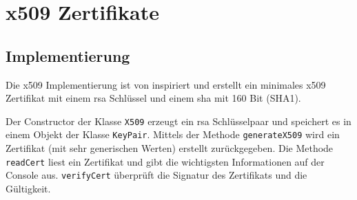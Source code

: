 \chapter{x509 Zertifikate}

\section{Implementierung}
Die x509 Implementierung ist von \cite{bouncy01} inspiriert und erstellt ein minimales x509 Zertifikat mit einem \gls{rsa} Schlüssel und einem \gls{sha} mit 160 Bit (SHA1).

Der Constructor der Klasse \texttt{X509} erzeugt ein \gls{rsa} Schlüsselpaar und speichert es in einem Objekt der Klasse \texttt{KeyPair}.
Mittels der Methode \texttt{generateX509} wird ein Zertifikat (mit sehr generischen Werten) erstellt zurückgegeben.
Die Methode \texttt{readCert} liest ein Zertifikat und gibt die wichtigsten Informationen auf der Console aus.
\texttt{verifyCert} überprüft die Signatur des Zertifikats und die Gültigkeit.
